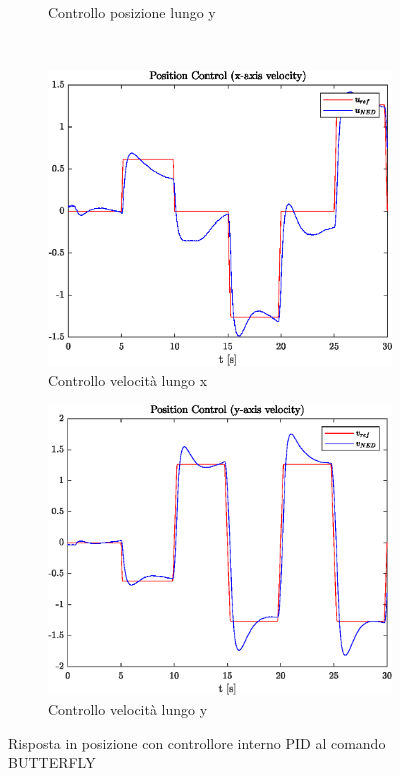 \begin{figure}
\begin{subfigure}{0.45\textwidth}
		\caption{Controllo posizione lungo y}
	\end{subfigure}
	\\
	\begin{subfigure}{0.45\textwidth}
		\centering
		\includegraphics[width=1\textwidth]{Simulazioni/Figure/PID/BUTTERFLY/PositionControlXVel}
		\caption{Controllo velocità lungo x}
	\end{subfigure}
	\hfill
	\begin{subfigure}{0.45\textwidth}
		\centering
		\includegraphics[width=1\textwidth]{Simulazioni/Figure/PID/BUTTERFLY/PositionControlYVel}
		\caption{Controllo velocità lungo y}
	\end{subfigure}
	\caption{Risposta in posizione con controllore interno PID al comando BUTTERFLY}
\end{figure}

